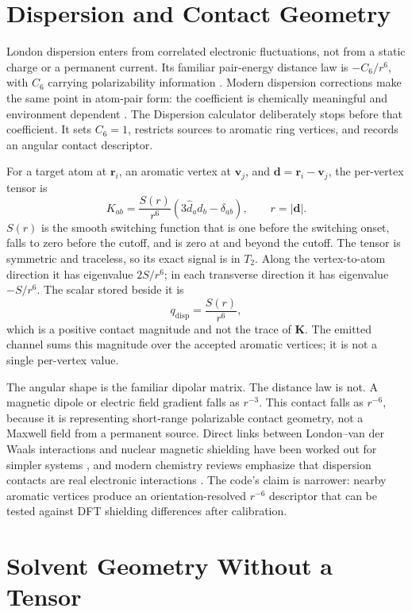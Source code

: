 \documentclass[11pt]{article}
\begin{document}
\section{Dispersion and Contact Geometry}

London dispersion enters from correlated electronic fluctuations, not from a
static charge or a permanent current. Its familiar pair-energy distance law is
\(-C_6/r^6\), with \(C_6\) carrying polarizability information \cite{london1937}.
Modern dispersion corrections make the same point in atom-pair form: the
coefficient is chemically meaningful and environment dependent
\cite{grimme2010,caldeweyher2019}. The Dispersion calculator deliberately stops
before that coefficient. It sets \(C_6=1\), restricts sources to aromatic ring
vertices, and records an angular contact descriptor.

For a target atom at \(\bm r_i\), an aromatic vertex at \(\bm v_j\), and
\(\bm d=\bm r_i-\bm v_j\), the per-vertex tensor is
\[
  K_{ab}
  =
  \frac{S(r)}{r^6}
  \left(3\hat d_a\hat d_b-\delta_{ab}\right),
  \qquad
  r=|\bm d|.
\]
\(S(r)\) is the smooth switching function that is one before the switching
onset, falls to zero before the cutoff, and is zero at and beyond the cutoff.
The tensor is symmetric and traceless, so its exact signal is in \(T_2\). Along
the vertex-to-atom direction it has eigenvalue \(2S/r^6\); in each transverse
direction it has eigenvalue \(-S/r^6\). The scalar stored beside it is
\[
  q_{\mathrm{disp}}=\frac{S(r)}{r^6},
\]
which is a positive contact magnitude and not the trace of \(\bm K\). The
emitted channel sums this magnitude over the accepted aromatic vertices; it is
not a single per-vertex value.

The angular shape is the familiar dipolar matrix. The distance law is not. A
magnetic dipole or electric field gradient falls as \(r^{-3}\). This contact
falls as \(r^{-6}\), because it is representing short-range polarizable contact
geometry, not a Maxwell field from a permanent source. Direct links between
London--van der Waals interactions and nuclear magnetic shielding have been
worked out for simpler systems \cite{kromhout1969}, and modern chemistry
reviews emphasize that dispersion contacts are real electronic interactions
\cite{wagner2015}. The code's claim is narrower: nearby aromatic vertices
produce an orientation-resolved \(r^{-6}\) descriptor that can be tested
against DFT shielding differences after calibration.

\section{Solvent Geometry Without a Tensor}
\end{document}
